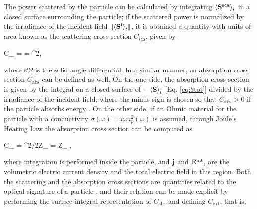 The power scattered by the particle can be calculated by integrating $\ev{\vb{S}^\text{sca}}_t$ in a closed surface surrounding the particle; if the scattered power is normalized by the irradiance of the incident field $\norm{\ev{\vb{S}^\text{i}}_t}$, it is obtained a quantity with units of area known as the scattering cross section $C_\text{sca}$, given by
%
 \begin{tcolorbox}[title = Scattering Cross Section,	ams align, breakable]
	C_ = \oint{}\cdot{}
				= \oint{}
									{^2}\dd{\Omega},
 \label{eq:Csca}
 \end{tcolorbox}
%
\noindent where $\dd{\Omega}$ is the solid angle differential.
In a similar manner, an absorption cross section $C_\text{abs}$ can be defined as well. On the one side, the absorption cross section is given by the integral on a closed surface of $-\ev{\vb{S}}_t$  [Eq. \eqref{eq:Stot}] divided by the irradiance of the incident field, where the minus sign is chosen so that $C_\text{abs}>0$ if the particle absorbs energy  \cite{bohren_absorption_1983}. On the other side, if an Ohmic material for the particle with a conductivity $\sigma(\omega) = i\omega n_p^2(\omega)$ \cite{jackson_classical_1999} is assumed, through Joule's Heating Law \cite{tsang_scattering_2000} the absorption cross section can be computed as
%
 \begin{tcolorbox}[title = Ohmic Particle - Absorption Cross Section,	ams align, breakable]
 	C_ =	 \int {}
 									{^2/2Z_}
				= \int\omega Z_  ,
 \label{eq:Cabs}
 \end{tcolorbox}%
%
\noindent where integration is performed inside the particle, and $\vb{j}$  and $\vb{E}^\text{int}$, are the volumetric electric current density and the total electric field in this region. Both the  scattering and the absorption cross sections are quantities related to the optical signature of a particle \cite{pellarin_forward_2019}, and their relation can be made explicit by performing the surface integral representation of $C_\text{abs}$ and defining $C_\text{ext}$, that is,
